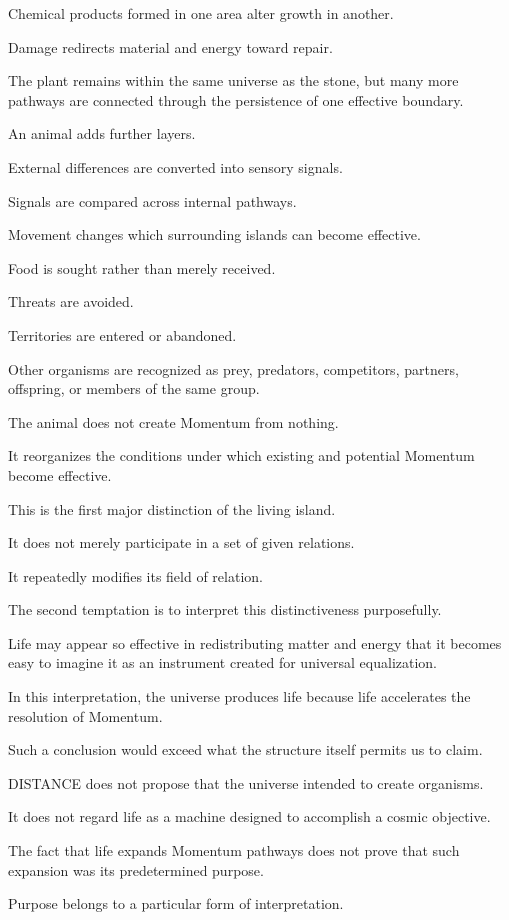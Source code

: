 Chemical products formed in one area alter growth in another.

Damage redirects material and energy toward repair.

The plant remains within the same universe as the stone, but many more pathways are connected through the persistence of one effective boundary.

An animal adds further layers.

External differences are converted into sensory signals.

Signals are compared across internal pathways.

Movement changes which surrounding islands can become effective.

Food is sought rather than merely received.

Threats are avoided.

Territories are entered or abandoned.

Other organisms are recognized as prey, predators, competitors, partners, offspring, or members of the same group.

The animal does not create Momentum from nothing.

It reorganizes the conditions under which existing and potential Momentum become effective.

This is the first major distinction of the living island.

It does not merely participate in a set of given relations.

It repeatedly modifies its field of relation.

The second temptation is to interpret this distinctiveness purposefully.

Life may appear so effective in redistributing matter and energy that it becomes easy to imagine it as an instrument created for universal equalization.

In this interpretation, the universe produces life because life accelerates the resolution of Momentum.

Such a conclusion would exceed what the structure itself permits us to claim.

DISTANCE does not propose that the universe intended to create organisms.

It does not regard life as a machine designed to accomplish a cosmic objective.

The fact that life expands Momentum pathways does not prove that such expansion was its predetermined purpose.

Purpose belongs to a particular form of interpretation.

